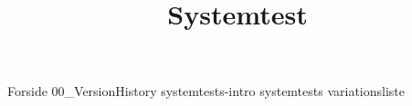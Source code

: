 \documentclass[a4paper,openany]{memoir}
\title{Systemtest}
\begin{document}
	{Forside}  \newpage
	\tableofcontents\thispagestyle{fancy}
	{00_VersionHistory}  \newpage
	{systemtests-intro}  \newpage
	{systemtests}  \newpage
	{variationsliste}  \newpage

	 {}
	\printbibliography
\end{document}
